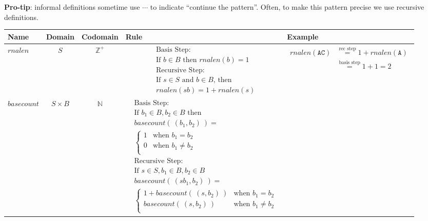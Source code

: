 \documentclass[12pt, oneside]{article}
\newcommand{\A}[0]{\texttt{A}}
\newcommand{\C}[0]{\texttt{C}}
\begin{document}
{\bf Pro-tip}: informal definitions sometime use $\cdots$ to indicate ``continue the pattern''. Often, 
to make this pattern precise we use recursive definitions.
\newpage
\begin{center}
\begin{tabular}{p{0.65in}ccp{2.4in}p{2.4in}}
{\scriptsize {\bf Name}} & {\scriptsize {\bf  Domain}} & {\scriptsize {\bf Codomain}} & {\scriptsize {\bf Rule}} &{\scriptsize {\bf Example}}\\
\hline 
$rnalen$ & $S$ & $\mathbb{Z}^+$ & 
    {\begin{align*}    
    &\textrm{Basis Step:} \\
    &\textrm{If } b \in B\textrm{ then } \textit{rnalen}(b) = 1 \\
    &\textrm{Recursive Step:}\\
    &\textrm{If } s \in S\textrm{ and } b \in B\textrm{, then  }\\
    &\textit{rnalen}(sb) = 1 + \textit{rnalen}(s)
    \end{align*}} & 
    {\begin{align*}
        rnalen(\A\C) &\overset{\text{rec step}}{=} 1 +rnalen(\A) \\ 
        &\overset{\text{basis step}}{=} 1 + 1 = 2
    \end{align*}}\\
\hline
$basecount$ & $S \times B$ & $\mathbb{N}$ & 
{\begin{align*}    
    &\textrm{Basis Step:} \\
    &\textrm{If } b_1 \in B, b_2 \in B \textrm{ then} \\
    &basecount(~(b_1, b_2)~) = \\
    &\begin{cases}
        1 & \textrm{when } b_1 = b_2 \\
        0 & \textrm{when } b_1 \neq b_2 \\
    \end{cases}\\
    &\textrm{Recursive Step:}\\
    &\textrm{If } s \in S, b_1 \in B, b_2 \in B\\
    &basecount(~(sb_1, b_2)~) = \\
    &\begin{cases}
        1 + \textit{basecount}(~(s, b_2)~) & \textrm{when } b_1 = b_2 \\
        \textit{basecount}(~(s, b_2)~) & \textrm{when } b_1 \neq b_2 \\
    \end{cases}

\end{align*}}
\end{tabular}
\end{center}
\end{document}

